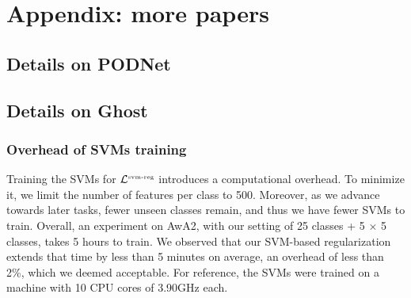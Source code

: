 \chapter{Appendix: more papers}
\label{chapter:appendix}

{}


\section{Details on PODNet}
\label{sec:appendix_podnet}

\section{Details on Ghost}
\label{sec:appendix_ghost}


\subsection{Overhead of SVMs training}

Training the SVMs for $\mathcal{L}^{\text{\tiny{svm-reg}}}$ introduces a computational overhead. To
minimize it, we limit the number of features per class to 500. Moreover, as we advance towards later
tasks, fewer unseen classes remain, and thus we have fewer SVMs to train. Overall, an experiment on
AwA2, with our setting of 25 classes + 5 $\times$ 5 classes, takes 5 hours to train. We observed
that our SVM-based regularization extends that time by less than 5 minutes on average, an overhead
of less than 2\%, which we deemed acceptable. For reference, the SVMs were trained on a machine with
10 CPU cores of 3.90GHz each.

